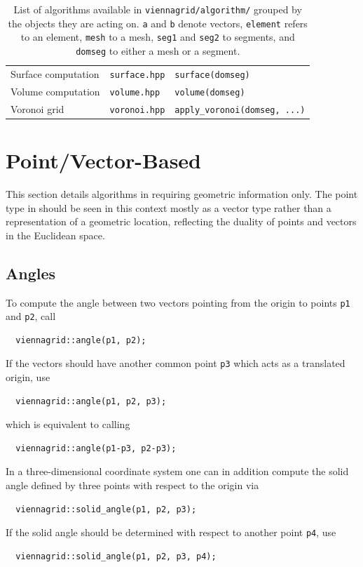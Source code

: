 \begin{table}
\begin{tabular}{|l|l|l|}
   Surface computation & \texttt{surface.hpp}            & \lstinline|surface(domseg)| \\
   Volume computation  & \texttt{volume.hpp}             & \lstinline|volume(domseg)| \\
   Voronoi grid        & \texttt{voronoi.hpp}            & \lstinline|apply_voronoi(domseg, ...)| \\
   \hline
 \end{tabular}
 \caption{List of algorithms available in \texttt{viennagrid/algorithm/} grouped by the objects they are acting on.
    \lstinline|a| and \lstinline|b| denote vectors, \lstinline|element| refers to an element,
    \lstinline|mesh| to a mesh, \lstinline|seg1| and \lstinline|seg2| to segments, and \lstinline|domseg| to either a mesh or a segment.}
 \label{tab:algorithms}
\end{table}


\section{Point/Vector-Based}
This section details algorithms in {\ViennaGrid} requiring geometric information only.
The point type in {\ViennaGrid} should be seen in this context mostly as a vector type rather than a representation of a geometric location, reflecting the duality of points and vectors in the Euclidean space.

  \subsection{Angles}
 To compute the angle between two vectors pointing from the origin to points \lstinline|p1| and \lstinline|p2|, call
 \begin{lstlisting}
  viennagrid::angle(p1, p2);
 \end{lstlisting}
 If the vectors should have another common point \lstinline|p3| which acts as a translated origin, use
 \begin{lstlisting}
  viennagrid::angle(p1, p2, p3);
 \end{lstlisting}
 which is equivalent to calling
 \begin{lstlisting}
  viennagrid::angle(p1-p3, p2-p3);
 \end{lstlisting}

 In a three-dimensional coordinate system one can in addition compute the solid angle defined by three points with respect to the origin via
 \begin{lstlisting}
  viennagrid::solid_angle(p1, p2, p3);
 \end{lstlisting}
 If the solid angle should be determined with respect to another point \lstinline|p4|, use
 \begin{lstlisting}
  viennagrid::solid_angle(p1, p2, p3, p4);
 \end{lstlisting}

